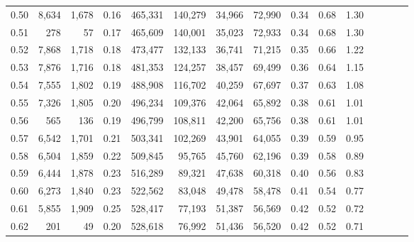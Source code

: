 \begin{tabular}{rrrcrrrrrrrrrrr}
0.50 &   8,634 &  1,678 &                                       0.16 &  465,331 &  140,279 &   34,966 &   72,990 &  0.34 &  0.68 &                         1.30 \\
0.51 &     278 &     57 &                                       0.17 &  465,609 &  140,001 &   35,023 &   72,933 &  0.34 &  0.68 &                         1.30 \\
0.52 &   7,868 &  1,718 &                                       0.18 &  473,477 &  132,133 &   36,741 &   71,215 &  0.35 &  0.66 &                         1.22 \\
0.53 &   7,876 &  1,716 &                                       0.18 &  481,353 &  124,257 &   38,457 &   69,499 &  0.36 &  0.64 &                         1.15 \\
0.54 &   7,555 &  1,802 &                                       0.19 &  488,908 &  116,702 &   40,259 &   67,697 &  0.37 &  0.63 &                         1.08 \\
0.55 &   7,326 &  1,805 &                                       0.20 &  496,234 &  109,376 &   42,064 &   65,892 &  0.38 &  0.61 &                         1.01 \\
0.56 &     565 &    136 &                                       0.19 &  496,799 &  108,811 &   42,200 &   65,756 &  0.38 &  0.61 &                         1.01 \\
0.57 &   6,542 &  1,701 &                                       0.21 &  503,341 &  102,269 &   43,901 &   64,055 &  0.39 &  0.59 &                         0.95 \\
0.58 &   6,504 &  1,859 &                                       0.22 &  509,845 &   95,765 &   45,760 &   62,196 &  0.39 &  0.58 &                         0.89 \\
0.59 &   6,444 &  1,878 &                                       0.23 &  516,289 &   89,321 &   47,638 &   60,318 &  0.40 &  0.56 &                         0.83 \\
0.60 &   6,273 &  1,840 &                                       0.23 &  522,562 &   83,048 &   49,478 &   58,478 &  0.41 &  0.54 &                         0.77 \\
0.61 &   5,855 &  1,909 &                                       0.25 &  528,417 &   77,193 &   51,387 &   56,569 &  0.42 &  0.52 &                         0.72 \\
0.62 &     201 &     49 &                                       0.20 &  528,618 &   76,992 &   51,436 &   56,520 &  0.42 &  0.52 &                         0.71 \\

\end{tabular}
